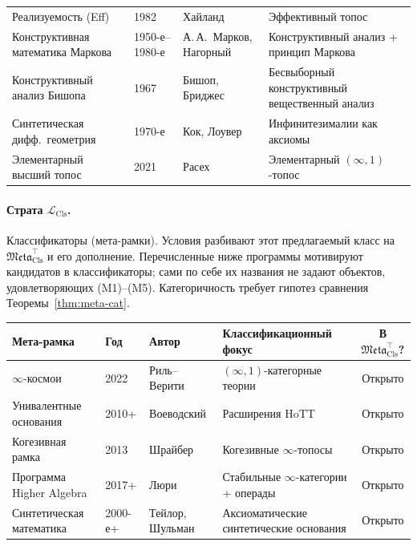 \documentclass[11pt]{article}
\theoremstyle{plain}
\theoremstyle{definition}
\newcommand{\Meta}{\mathfrak{Meta}}
\newcommand{\LCls}{\mathcal{L}_{\mathrm{Cls}}}
\begin{document}
\begin{longtable}{@{}p{3.8cm}l p{4cm} p{4.6cm}@{}}
Реализуемость (Eff) & 1982 & Хайланд & Эффективный топос \\
Конструктивная математика Маркова & 1950-е--1980-е & А.\,А.~Марков, Нагорный & Конструктивный анализ + принцип Маркова \\
Конструктивный анализ Бишопа & 1967 & Бишоп, Бриджес & Бесвыборный конструктивный вещественный анализ \\
Синтетическая дифф.~геометрия & 1970-е & Кок, Лоувер & Инфинитезималии как аксиомы \\
Элементарный высший топос & 2021 & Расех & Элементарный $(\infty, 1)$-топос \\
\bottomrule
\end{longtable}

\paragraph{Страта $\LCls$.} Классификаторы (мета-рамки). Условия разбивают этот предлагаемый класс на $\Meta_{\mathrm{Cls}}^{\top}$ и его дополнение. Перечисленные ниже программы мотивируют кандидатов в классификаторы; сами по себе их названия не задают объектов, удовлетворяющих (M1)--(M5). Категоричность требует гипотез сравнения Теоремы~\ref{thm:meta-cat}.

\begin{longtable}{@{}p{3.3cm}l p{3cm} p{4.4cm}c@{}}
\toprule
Мета-рамка & Год & Автор & Классификационный фокус & В $\Meta_{\mathrm{Cls}}^{\top}$? \\ \midrule
$\infty$-космои & 2022 & Риль--Верити & $(\infty, 1)$-категорные теории & Открыто \\
Унивалентные основания & 2010+ & Воеводский & Расширения HoTT & Открыто \\
Когезивная рамка & 2013 & Шрайбер & Когезивные $\infty$-топосы & Открыто \\
Программа Higher Algebra & 2017+ & Люри & Стабильные $\infty$-категории + операды & Открыто \\
Синтетическая математика & 2000-е+ & Тейлор, Шульман & Аксиоматические синтетические основания & Открыто \\
\bottomrule
\end{longtable}
\end{document}
